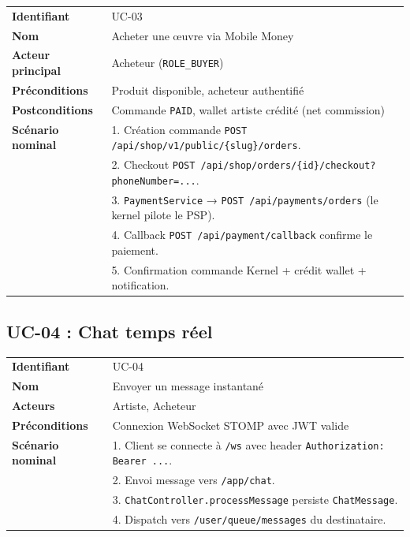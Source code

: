 \begin{table}[h]
  \centering
  \small
  \begin{tabular}{@{}p{3.5cm}p{10cm}@{}}
    \toprule
    \textbf{Identifiant} & UC-03 \\
    \textbf{Nom} & Acheter une œuvre via Mobile Money \\
    \textbf{Acteur principal} & Acheteur (\texttt{ROLE\_BUYER}) \\
    \textbf{Préconditions} & Produit disponible, acheteur authentifié \\
    \textbf{Postconditions} & Commande \texttt{PAID}, wallet artiste crédité (net commission) \\
    \midrule
    \textbf{Scénario nominal} &
    1. Création commande \texttt{POST /api/shop/v1/public/\{slug\}/orders}.\\
    & 2. Checkout \texttt{POST /api/shop/orders/\{id\}/checkout?phoneNumber=...}.\\
    & 3. \texttt{PaymentService} →  \texttt{POST /api/payments/orders} (le kernel pilote le PSP).\\
    & 4. Callback \texttt{POST /api/payment/callback} confirme le paiement.\\
    & 5. Confirmation commande Kernel + crédit wallet + notification. \\
    \bottomrule
  \end{tabular}
\end{table}

\subsection{UC-04 : Chat temps réel}

\begin{table}[h]
  \centering
  \small
  \begin{tabular}{@{}p{3.5cm}p{10cm}@{}}
    \toprule
    \textbf{Identifiant} & UC-04 \\
    \textbf{Nom} & Envoyer un message instantané \\
    \textbf{Acteurs} & Artiste, Acheteur \\
    \textbf{Préconditions} & Connexion WebSocket STOMP avec JWT valide \\
    \midrule
    \textbf{Scénario nominal} &
    1. Client se connecte à \texttt{/ws} avec header \texttt{Authorization: Bearer ...}.\\
    & 2. Envoi message vers \texttt{/app/chat}.\\
    & 3. \texttt{ChatController.processMessage} persiste \texttt{ChatMessage}.\\
    & 4. Dispatch vers \texttt{/user/queue/messages} du destinataire. \\
    \bottomrule
  \end{tabular}
\end{table}

